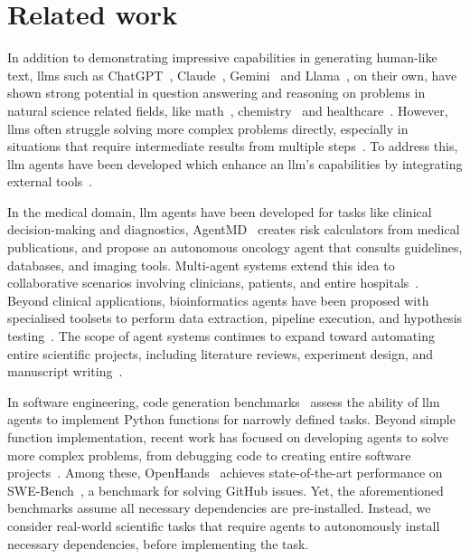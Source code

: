 \section{Related work}
In addition to demonstrating impressive capabilities in generating human-like text, \glspl{llm} such as ChatGPT~\cite{ouyang2022training}, Claude~\cite{anthropic_claude}, Gemini~\cite{google2024gemini} and Llama~\cite{meta2024llama3}, on their own, have shown strong potential in question answering and reasoning on problems in natural science related fields, like math~\cite{shao2024deepseekmathpushinglimitsmathematical}, chemistry~\cite{bran2024augmenting} and healthcare~\cite{singhal2023llms}. However, \glspl{llm} often struggle solving more complex problems directly, especially in situations that require intermediate results from multiple steps~\cite{valmeekam2023planningabilitieslargelanguage}. 
To address this, \gls{llm} agents have been developed which enhance an \gls{llm}'s capabilities by integrating external tools~\cite{schick2023toolformer}.

In the medical domain, \gls{llm} agents have been developed for tasks like clinical decision-making and diagnostics, \eg AgentMD~\cite{jin2024agentmd} creates risk calculators from medical publications, and \citet{ferber2024autonomous} propose an autonomous oncology agent that consults guidelines, databases, and imaging tools. Multi-agent systems extend this idea to collaborative scenarios involving clinicians, patients, and entire hospitals~\cite{kim2024mdagents,li2025agenthospital}. Beyond clinical applications, bioinformatics agents have been proposed with specialised toolsets to perform data extraction, pipeline execution, and hypothesis testing~\cite{ding2024automatingexploratoryproteomicsresearch,xin2024bioinformaticsagent}. 
The scope of agent systems continues to expand toward automating entire scientific projects, including literature reviews, experiment design, and manuscript writing~\cite{lu2024aiscientistfullyautomated, schmidgall2025agentlaboratory}.

In software engineering, code generation benchmarks~\cite{zhuo2024bigcodebench,jain2024livecodebench} assess the ability of \gls{llm} agents to implement Python functions for narrowly defined tasks.
Beyond simple function implementation, recent work has focused on developing agents to solve more complex problems, from debugging code to creating entire software projects~\cite{wang2024openhands,yang2024sweagent,qian2024chatdev}.
Among these, OpenHands~\cite{wang2024openhands} achieves state-of-the-art performance on SWE-Bench~\cite{jimenez2024swebench}, a benchmark for solving GitHub issues. 
Yet, the aforementioned benchmarks assume all necessary dependencies are pre-installed.
Instead, we consider real-world scientific tasks that require agents to autonomously install necessary dependencies, before implementing the task.


